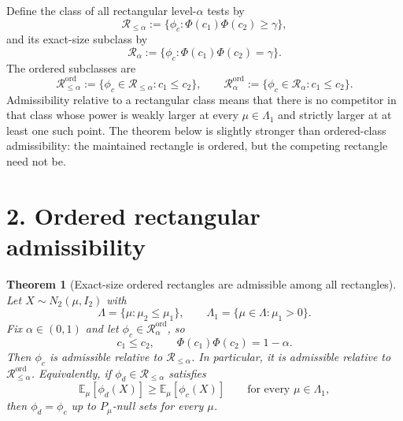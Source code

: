\documentclass[12pt]{article}
\newtheorem{theorem}{Theorem}
\theoremstyle{definition}
\theoremstyle{remark}
\newcommand{\E}{\mathbb E}
\newcommand{\phitest}{\phi}
\newcommand{\gammalev}{\gamma}
\begin{document}
Define the class of all rectangular level-$\alpha$ tests by
\[
\mathcal R_{\le\alpha}
:=
\{\phitest_c:\Phi(c_1)\Phi(c_2)\ge \gammalev\},
\]
and its exact-size subclass by
\[
\mathcal R_{\alpha}
:=
\{\phitest_c:\Phi(c_1)\Phi(c_2)=\gammalev\}.
\]
The ordered subclasses are
\[
\mathcal R^{\mathrm{ord}}_{\le\alpha}
:=
\{\phitest_c\in\mathcal R_{\le\alpha}:c_1\le c_2\},
\qquad
\mathcal R^{\mathrm{ord}}_{\alpha}
:=
\{\phitest_c\in\mathcal R_{\alpha}:c_1\le c_2\}.
\]
Admissibility relative to a rectangular class means that there is no competitor in that class whose power is weakly larger at every $\mu\in\Lambda_1$ and strictly larger at at least one such point. The theorem below is slightly stronger than ordered-class admissibility: the maintained rectangle is ordered, but the competing rectangle need not be.

\section*{2. Ordered rectangular admissibility}

\begin{theorem}[Exact-size ordered rectangles are admissible among all rectangles]\label{thm:ordered-rectangle-admissibility}
Let $X\sim N_2(\mu,I_2)$ with
\[
\Lambda=\{\mu:\mu_2\le\mu_1\},
\qquad
\Lambda_1=\{\mu\in\Lambda:\mu_1>0\}.
\]
Fix $\alpha\in(0,1)$ and let $\phitest_c\in\mathcal R^{\mathrm{ord}}_{\alpha}$, so
\[
c_1\le c_2,
\qquad
\Phi(c_1)\Phi(c_2)=1-\alpha.
\]
Then $\phitest_c$ is admissible relative to $\mathcal R_{\le\alpha}$. In particular, it is admissible relative to $\mathcal R^{\mathrm{ord}}_{\le\alpha}$.
Equivalently, if $\phitest_d\in\mathcal R_{\le\alpha}$ satisfies
\[
\E_\mu[\phitest_d(X)]\ge \E_\mu[\phitest_c(X)]
\qquad\text{for every }\mu\in\Lambda_1,
\]
then $\phitest_d=\phitest_c$ up to $P_\mu$-null sets for every $\mu$.
\end{theorem}
\end{document}
